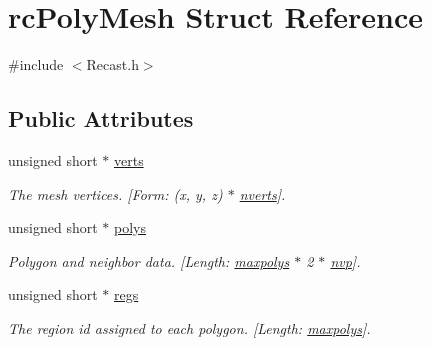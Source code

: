 \hypertarget{structrcPolyMesh}{}\section{rc\+Poly\+Mesh Struct Reference}
\label{structrcPolyMesh}


{\ttfamily \#include $<$Recast.\+h$>$}

\subsection*{Public Attributes}
\begin{DoxyCompactItemize}
\item 
\mbox{\label{structrcPolyMesh_a6fb2125631266e4cfc462b856d533966}} 
unsigned short $\ast$ \hyperlink{structrcPolyMesh_a6fb2125631266e4cfc462b856d533966}{verts}
\begin{DoxyCompactList}\small\item\em The mesh vertices. \mbox{[}Form\+: (x, y, z) $\ast$ \hyperlink{structrcPolyMesh_ac9c762a21343c45649638e02332e53eb}{nverts}\mbox{]}. \end{DoxyCompactList}\item 
\mbox{\label{structrcPolyMesh_a446054c826c580a8b1036be4b92e41de}} 
unsigned short $\ast$ \hyperlink{structrcPolyMesh_a446054c826c580a8b1036be4b92e41de}{polys}
\begin{DoxyCompactList}\small\item\em Polygon and neighbor data. \mbox{[}Length\+: \hyperlink{structrcPolyMesh_afc6261e7cee3e3ff2a83b6ee8baf14a9}{maxpolys} $\ast$ 2 $\ast$ \hyperlink{structrcPolyMesh_ab0c55272b556ffc9db9e643b463cb66a}{nvp}\mbox{]}. \end{DoxyCompactList}\item 
\mbox{\label{structrcPolyMesh_ab58b865ca7cf2230143aad77f5be4103}} 
unsigned short $\ast$ \hyperlink{structrcPolyMesh_ab58b865ca7cf2230143aad77f5be4103}{regs}
\begin{DoxyCompactList}\small\item\em The region id assigned to each polygon. \mbox{[}Length\+: \hyperlink{structrcPolyMesh_afc6261e7cee3e3ff2a83b6ee8baf14a9}{maxpolys}\mbox{]}. \end{DoxyCompactList}\item 
\mbox{\label{structrcPolyMesh_a36afba0b01f0050ec3ecfac73513bae5}} 

\end{DoxyCompactItemize}
